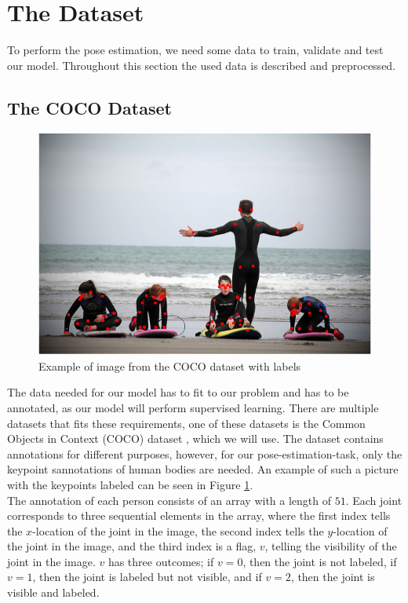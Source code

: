 \documentclass[main.tex]{subfiles}
\begin{document}
\section{The Dataset}
To perform the pose estimation, we need some data to train, validate and test our model. Throughout this section the used data is described and preprocessed.

\subsection{The COCO Dataset}
\begin{figure}[H]
    \centering
    \includegraphics[height = 4 cm]{../entities/coco_example.png}
    \caption{Example of image from the COCO dataset with labels}
    \label{fig:coco_example}
\end{figure}
The data needed for our model has to fit to our problem and has to be annotated, as our model will perform supervised learning. There are multiple datasets that fits these requirements, one of these datasets is the Common Objects in Context (COCO) dataset \cite{COCO_article}, which we will use. The dataset contains annotations for different purposes, however, for our pose-estimation-task, only the keypoint sannotations of human bodies are needed. An example of such a picture with the keypoints labeled can be seen in Figure \ref{fig:coco_example}. \\
The annotation of each person consists of an array with a length of $51$. Each joint corresponds to three sequential elements in the array, where the first index tells the $x$-location of the joint in the image, the second index tells the $y$-location of the joint in the image, and the third index is a flag, $v$, telling the visibility of the joint in the image. $v$ has three outcomes; if $v = 0$, then the joint is not labeled, if $v = 1$, then the joint is labeled but not visible, and if $v = 2$, then the joint is visible and labeled. \\
\end{document}
